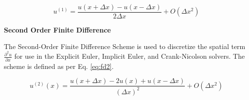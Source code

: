 \documentclass[10pt, letter, showtrims]{extarticle}
\begin{document}
%		
%		
%		
%		
		
		\begin{equation}
		\label{eq:cds}
			u^{(1)} = \frac{u(x + \Delta x) - u(x - \Delta x)}{2 \Delta x} + O(\Delta x^{2})
		\end{equation}
		
		\noindent
		\textbf{Second Order Finite Difference}
		
		\noindent
		The Second-Order Finite Difference Scheme is used to discretize the spatial term $\frac{\partial^{2}u}{\partial x}$ for use in the Explicit Euler, Implicit Euler, and Crank-Nicolson solvers. The scheme is defined as per Eq. \ref{eq:fd2}.
		
%		
%		
%		
		
		\begin{equation}
		\label{eq:fd2}
			u^{(2)}(x) = \frac{u(x + \Delta x) - 2 u(x) + u(x - \Delta x)}{(\Delta x)^{2}} + O(\Delta x^{2})
		\end{equation}	
		
		\pagebreak
		
\end{document}
